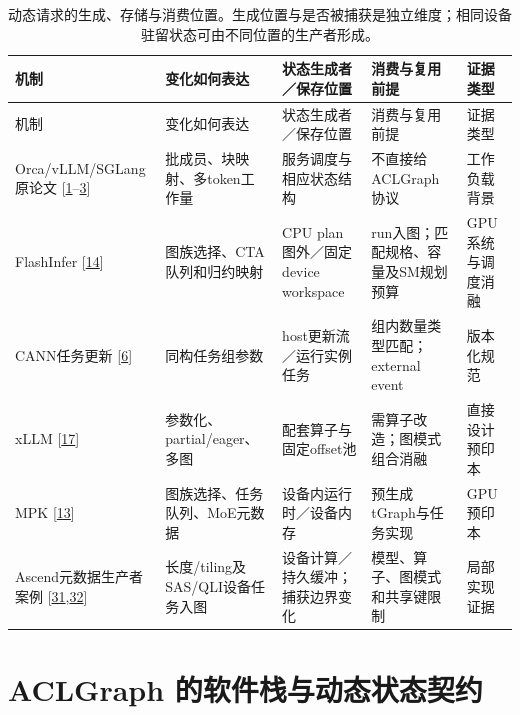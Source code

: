 \documentclass[
  UTF8,
  zihao=5]{ctexart}
\begin{document}
\begin{longtable}[]{@{}
  >{\raggedright\arraybackslash}p{}
  >{\raggedright\arraybackslash}p{}
  >{\raggedright\arraybackslash}p{}
  >{\raggedright\arraybackslash}p{}
  >{\raggedright\arraybackslash}p{}@{}}
\caption{动态请求的生成、存储与消费位置。生成位置与是否被捕获是独立维度；相同设备驻留状态可由不同位置的生产者形成。}\tabularnewline
\toprule
机制 & 变化如何表达 & 状态生成者／保存位置 & 消费与复用前提 &
证据类型 \\
\midrule
\endfirsthead
\toprule
机制 & 变化如何表达 & 状态生成者／保存位置 & 消费与复用前提 &
证据类型 \\
\midrule
\endhead
Orca/vLLM/SGLang原论文
{[}\protect\hyperlink{ref-yu2022orca}{1}--\protect\hyperlink{ref-zheng2024sglang}{3}{]}
& 批成员、块映射、多token工作量 & 服务调度与相应状态结构 &
不直接给ACLGraph协议 & 工作负载背景 \\
FlashInfer {[}\protect\hyperlink{ref-ye2025flashinfer}{14}{]} &
图族选择、CTA队列和归约映射 & CPU plan图外／固定device workspace &
run入图；匹配规格、容量及SM规划预算 & GPU系统与调度消融 \\
CANN任务更新 {[}\protect\hyperlink{ref-cann910update}{6}{]} &
同构任务组参数 & host更新流／运行实例任务 & 组内数量类型匹配；external
event & 版本化规范 \\
xLLM {[}\protect\hyperlink{ref-liu2025xllm}{17}{]} &
参数化、partial/eager、多图 & 配套算子与固定offset池 &
需算子改造；图模式组合消融 & 直接设计预印本 \\
MPK {[}\protect\hyperlink{ref-cheng2026mpk}{13}{]} &
图族选择、任务队列、MoE元数据 & 设备内运行时／设备内存 &
预生成tGraph与任务实现 & GPU预印本 \\
Ascend元数据生产者案例
{[}\protect\hyperlink{ref-vllmascendpr21259}{31},\protect\hyperlink{ref-vllmascendpr21281}{32}{]}
& 长度/tiling及SAS/QLI设备任务入图 & 设备计算／持久缓冲；捕获边界变化 &
模型、算子、图模式和共享键限制 & 局部实现证据 \\
\bottomrule
\end{longtable}

\hypertarget{aclgraph-ux7684ux8f6fux4ef6ux6808ux4e0eux52a8ux6001ux72b6ux6001ux5951ux7ea6}{%
\section{ACLGraph
的软件栈与动态状态契约}\label{aclgraph-ux7684ux8f6fux4ef6ux6808ux4e0eux52a8ux6001ux72b6ux6001ux5951ux7ea6}}
\end{document}
